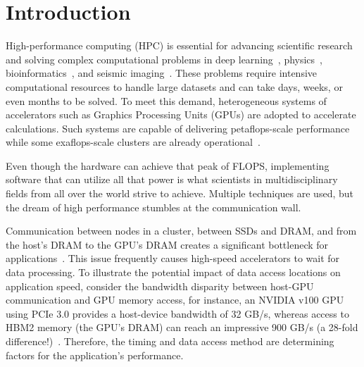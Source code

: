 \documentclass[Ingles,Final]{ic-tese-v3}
\begin{document}


\listoffigures

\listoftables
\glsaddall
\printglossary[type=\acronymtype, style=wideheader, title=List of Acronyms \& Glossary,notoc,nonumberlist]







\tableofcontents


\fimdaspaginasiniciais


\chapter{Introduction}
\label{ch:intro}

High-performance computing (HPC) is essential for advancing scientific research and solving complex computational problems in deep learning~\cite{silvano2023survey}, physics~\cite{karp2025}, bioinformatics~\cite{mikailov2017}, and seismic imaging~\cite{okita2021,aldarwish2025}. These problems require intensive computational resources to handle large datasets and can take days, weeks, or even months to be solved. To meet this demand, heterogeneous systems of accelerators such as Graphics Processing Units (GPUs) are adopted to accelerate calculations. Such systems are capable of delivering petaflops-scale performance~\cite{sdumont2} while some exaflops-scale clusters are already operational~\cite{top500}.

Even though the hardware can achieve that peak of FLOPS, implementing software that can utilize all that power is what scientists in multidisciplinary fields from all over the world strive to achieve. Multiple techniques are used, but the dream of high performance stumbles at the communication wall.

Communication between nodes in a cluster, between SSDs and DRAM, and from the host's DRAM to the GPU's DRAM creates a significant bottleneck for applications~\cite{maurya2024, rigon2024}. This issue frequently causes high-speed accelerators to wait for data processing. To illustrate the potential impact of data access locations on application speed, consider the bandwidth disparity between host-GPU communication and GPU memory access, for instance, an NVIDIA v100 GPU using PCIe 3.0 provides a host-device bandwidth of 32 GB/s, whereas access to HBM2 memory (the GPU's DRAM) can reach an impressive 900 GB/s (a 28-fold difference!)~\cite{v100}. Therefore, the timing and data access method are determining factors for the application's performance.
\end{document}

